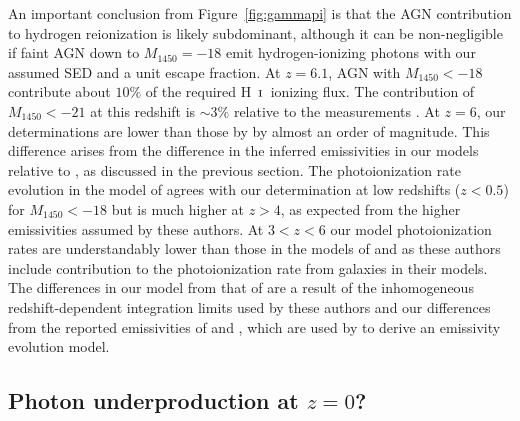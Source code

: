 \documentclass[fleqn,usenatbib]{mnras}
\def\HI{\hbox{H~$\scriptstyle\rm I$}}
\begin{document}
An important conclusion from Figure~\ref{fig:gammapi} is that the AGN
contribution to hydrogen reionization is likely subdominant, although
it can be non-negligible if faint AGN down to $M_{1450}=-18$ emit
hydrogen-ionizing photons with our assumed SED and a unit escape
fraction.  At $z=6.1$, AGN with $M_{1450}<-18$ contribute about $10\%$
of the required \HI\ ionizing flux.  The contribution of
$M_{1450}<-21$ at this redshift is $\sim 3\%$ relative to the
measurements \citep{2011MNRAS.412.2543C, 2018MNRAS.473..560D,
  2018ApJ...855..106D}.  At $z=6$, our determinations are lower than
those by \citet{2015AA...578A..83G} by almost an order of magnitude.
This difference arises from the difference in the inferred
emissivities in our models relative to \citet{2015AA...578A..83G}, as
discussed in the previous section.  The photoionization rate evolution
in the model of \citet{2015ApJ...813L...8M} agrees with our
determination at low redshifts ($z<0.5$) for $M_{1450}<-18$ but is
much higher at $z>4$, as expected from the higher emissivities assumed
by these authors.  At $3<z<6$ our model photoionization rates are
understandably lower than those in the models of
\citet{2017ApJ...837..106O} and \citet{2018arXiv180104931P} as these
authors include contribution to the photoionization rate from galaxies
in their models.  The differences in our model from that of
\citet{2015MNRAS.451L..30K} are a result of the inhomogeneous
redshift-dependent integration limits used by these authors and our
differences from the reported emissivities of
\citet{2009MNRAS.392...19C} and \citet{2013A&A...551A..29P}, which are
used by \citet{2015MNRAS.451L..30K} to derive an emissivity evolution
model.

\subsection{Photon underproduction at $z=0$?}
\end{document}
